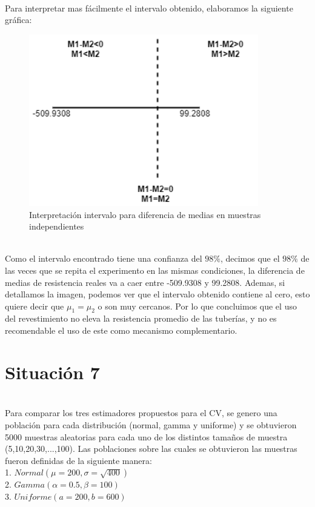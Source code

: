 \documentclass[letterpaper,12pt,onecolumn,titlepage]{article}
\begin{document}
~\\ Para interpretar mas f\'{a}cilmente el intervalo obtenido, elaboramos la siguiente gr\'{a}fica:
\begin{figure}[!h]
    \begin{center}
        \includegraphics[width=10cm]{Figuras/Grafico5.png}
        \caption{Interpretaci\'{o}n intervalo para diferencia de medias en muestras independientes}
        \label{fig:Densidad}
    \end{center}
\end{figure}
~\\ Como el intervalo encontrado tiene una confianza del $98\%$, decimos que el $98\%$ de las veces que se repita el experimento en las mismas condiciones, la diferencia de medias de resistencia reales va a caer entre -509.9308 y 99.2808. Ademas, si detallamos la imagen, podemos ver que el intervalo obtenido contiene al cero, esto quiere decir que $\mu_1=\mu_2$ o son muy cercanos. Por lo que concluimos que el uso del revestimiento no eleva la resistencia promedio de las tuber\'{i}as, y no es recomendable el uso de este como mecanismo complementario.

\pagebreak\section{Situaci\'{o}n 7}
~\\ Para comparar los tres estimadores propuestos para el CV, se genero una poblaci\'{o}n para cada distribuci\'{o}n (normal, gamma y uniforme) y se obtuvieron 5000 muestras aleatorias para cada uno de los distintos tama\~{n}os de muestra (5,10,20,30,...,100). Las poblaciones sobre las cuales se obtuvieron las muestras fueron definidas de la siguiente manera:
~\\ 1. $Normal(\mu=200,\sigma=\sqrt{400})$
~\\ 2. $Gamma(\alpha=0.5,\beta=100)$
~\\ 3. $Uniforme(a=200,b=600)$
\end{document}
